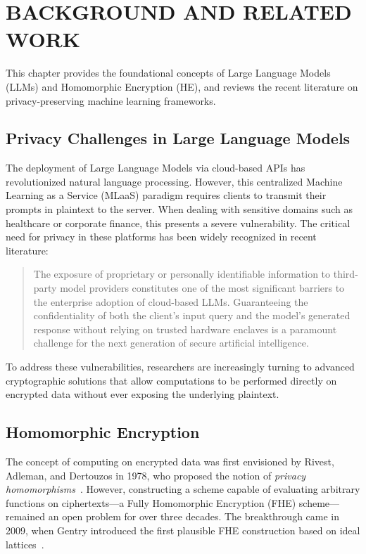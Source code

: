 \chapter{BACKGROUND AND RELATED WORK}
\label{ch:background}

This chapter provides the foundational concepts of Large Language Models (LLMs) and Homomorphic Encryption (HE), and reviews the recent literature on privacy-preserving machine learning frameworks.

\section{Privacy Challenges in Large Language Models}
The deployment of Large Language Models via cloud-based APIs has revolutionized natural language processing. However, this centralized Machine Learning as a Service (MLaaS) paradigm requires clients to transmit their prompts in plaintext to the server. When dealing with sensitive domains such as healthcare or corporate finance, this presents a severe vulnerability. The critical need for privacy in these platforms has been widely recognized in recent literature:

\begin{quote}
    The exposure of proprietary or personally identifiable information to third-party model providers constitutes one of the most significant barriers to the enterprise adoption of cloud-based LLMs. Guaranteeing the confidentiality of both the client's input query and the model's generated response without relying on trusted hardware enclaves is a paramount challenge for the next generation of secure artificial intelligence.
\end{quote}

To address these vulnerabilities, researchers are increasingly turning to advanced cryptographic solutions that allow computations to be performed directly on encrypted data without ever exposing the underlying plaintext.

\section{Homomorphic Encryption}

The concept of computing on encrypted data was first envisioned by Rivest, Adleman, and Dertouzos in 1978, who proposed the notion of \emph{privacy homomorphisms}~\cite{rivest1978data}. However, constructing a scheme capable of evaluating arbitrary functions on ciphertexts---a Fully Homomorphic Encryption (FHE) scheme---remained an open problem for over three decades. The breakthrough came in 2009, when Gentry introduced the first plausible FHE construction based on ideal lattices~\cite{gentry2009fully}.

